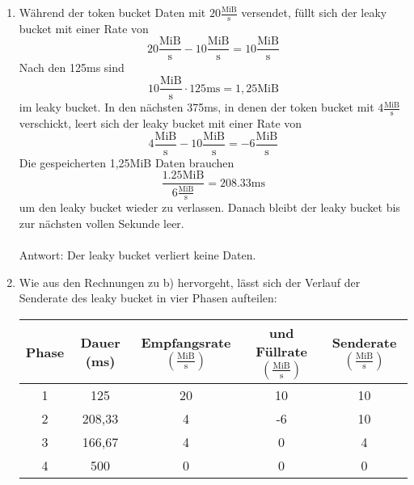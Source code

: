 \documentclass[a4paper,
			llpt,
			solution,
			accentcolor=tud2d,
			colorbacktitle
			]
			{tudexercise}
\newcommand{\MiBs}{\frac{\mathrm{MiB}}{\mathrm{s}}}
\begin{document}
\begin{enumerate}
\begin{multicols}{2}
\end{multicols}
\newpage
\item
Während der token bucket Daten mit $20\MiBs$ versendet, füllt sich der leaky bucket mit einer Rate von
$$
20 \MiBs - 10\MiBs = 10\MiBs
$$
Nach den 125ms sind
$$
10\MiBs  \cdot 125\mathrm{ms} = 1,25 \mathrm{MiB}
$$ im leaky bucket.
In den nächsten 375ms, in denen der token bucket mit $4\MiBs$ verschickt, leert sich der leaky bucket mit einer Rate von
$$
4\MiBs - 10\MiBs = -6 \MiBs
$$
Die gespeicherten 1,25MiB Daten brauchen
$$
\frac{1.25\mathrm{MiB}}{6\MiBs} = 208.33\mathrm{ms}
$$
um den leaky bucket wieder zu verlassen.
Danach bleibt der leaky bucket bis zur nächsten vollen Sekunde leer.
\\\\
Antwort: Der leaky bucket verliert keine Daten.
\item

Wie aus den Rechnungen zu b) hervorgeht, lässt sich der Verlauf der Senderate des leaky bucket in vier Phasen aufteilen:
\begin{center}
\begin{tabular}{|c|c|c|c|c|}
\hline
Phase 
&
Dauer (ms)
&
Empfangsrate $\left( \MiBs \right)$
&
und Füllrate $\left( \MiBs \right)$
&
Senderate $\left( \MiBs \right)$
\\ \hline
1 & 125    & 20 & 10 & 10 \\ \hline
2 & 208,33 &  4 & -6 & 10 \\ \hline
3 & 166,67 &  4 &  0 &  4 \\ \hline
4 & 500    &  0 &  0 &  0 \\ \hline
\end{tabular}
\end{center}
\begin{center}
\end{center}
\end{enumerate}

\subsubsection{}



\subsubsection{}


\subsection{}
\end{document}
